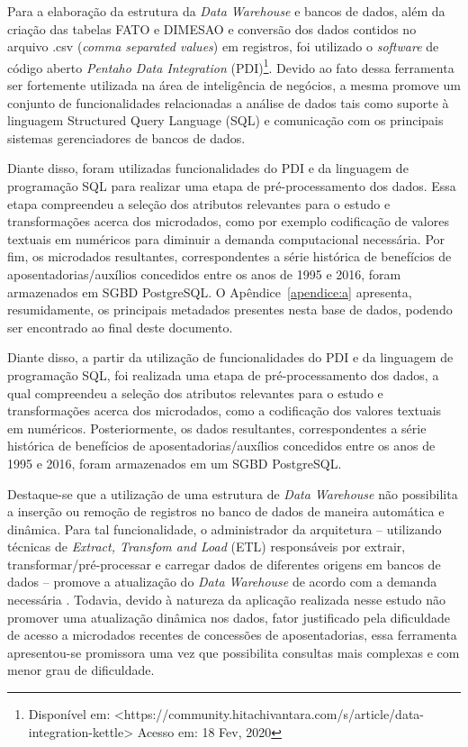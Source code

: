 Para a elaboração da estrutura da \textit{Data Warehouse} e bancos de dados, além da criação das tabelas FATO e DIMESAO e conversão dos dados contidos no arquivo .csv (\textit{comma separated values}) em registros, foi utilizado o \textit{software} de código aberto \textit{Pentaho Data Integration} (PDI)\footnote{Disponível em: <https://community.hitachivantara.com/s/article/data-integration-kettle> Acesso em: 18 Fev, 2020}. Devido ao fato dessa ferramenta ser fortemente utilizada na área de inteligência de negócios, a mesma promove um conjunto de funcionalidades relacionadas a análise de dados tais como suporte à linguagem Structured Query Language (SQL) e comunicação com os principais sistemas gerenciadores de bancos de dados. 

Diante disso, foram utilizadas funcionalidades do PDI e da linguagem de programação SQL para realizar uma etapa de pré-processamento dos dados. Essa etapa compreendeu a seleção dos atributos relevantes para o estudo e transformações acerca dos microdados, como por exemplo codificação de valores textuais em numéricos para diminuir a demanda computacional necessária. Por fim, os microdados resultantes, correspondentes a série histórica de benefícios de aposentadorias/auxílios concedidos entre os anos de 1995 e 2016, foram armazenados em SGBD PostgreSQL. O Apêndice~\ref{apendice:a} apresenta, resumidamente, os principais metadados presentes nesta base de dados, podendo ser encontrado ao final deste documento.
	
Diante disso, a partir da utilização de funcionalidades do PDI e da linguagem de programação SQL, foi realizada uma etapa de pré-processamento dos dados, a qual compreendeu a seleção dos atributos relevantes para o estudo e transformações acerca dos microdados, como a codificação dos valores textuais em numéricos. Posteriormente, os dados resultantes, correspondentes a série histórica de benefícios de aposentadorias/auxílios concedidos entre os anos de 1995 e 2016, foram armazenados em um SGBD PostgreSQL.

Destaque-se que a utilização de uma estrutura de \textit{Data Warehouse} não possibilita a inserção ou remoção de registros no banco de dados de maneira automática e dinâmica. Para tal funcionalidade, o administrador da arquitetura – utilizando técnicas de \textit{Extract, Transfom and Load} (ETL) responsáveis por extrair, transformar/pré-processar e carregar dados de diferentes origens em bancos de dados – promove a atualização do \textit{Data Warehouse} de acordo com a demanda necessária \cite{cap05_ref12, cap05_ref13}. Todavia, devido à natureza da aplicação realizada nesse estudo não promover uma atualização dinâmica nos dados, fator justificado pela dificuldade de acesso a microdados recentes de concessões de aposentadorias, essa ferramenta apresentou-se promissora uma vez que possibilita consultas mais complexas e com menor grau de dificuldade.  

